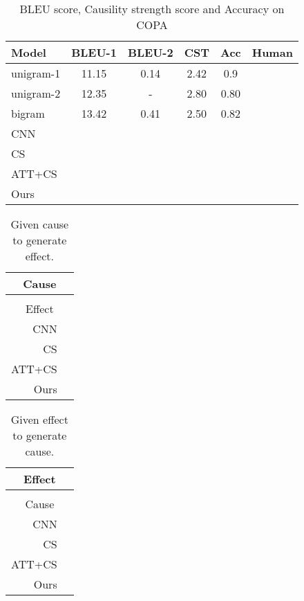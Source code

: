 \begin{table}[th]
	\centering
    \small
	\begin{tabular}{|l|c|c|c|c|c|}
		\hline
		Model &   BLEU-1 & BLEU-2 & CST & Acc & Human\\
		\hline
        unigram-1 & 11.15 & 0.14 & 2.42 & 0.9 & \\
        unigram-2 & 12.35 & -  & 2.80 & 0.80 & \\
        bigram & 13.42 & 0.41 & 2.50 & 0.82 & \\
		\hline
		CNN & & & & & \\
		CS & & & & & \\
		ATT+CS & & & & & \\
		\hline
		Ours & & & & & \\
		\hline
	\end{tabular}
	\caption{BLEU score, Causility strength score and Accuracy on COPA}
	\label{tab:copa}
\end{table}

\begin{table*}[th]
    \centering
    \small
    \begin{tabular}{r|l}%
    \hline
    \multicolumn{2}{c}{Cause}\\ 
    \hline
    \multicolumn{2}{c}{}\\ 
    \hline
    \multicolumn{2}{c}{Effect} \\
    \hline
    CNN & \\
    \hline
    CS & \\
    \hline
    ATT+CS & \\
    \hline
    Ours & \\
    \hline
    \end{tabular}
    \caption{Given cause to generate effect.}
    \label{tab:cause_exp}
\end{table*}

\begin{table*}[th]
    \centering
    \small
    \begin{tabular}{r|l}%
    \hline
    \multicolumn{2}{c}{Effect}\\ 
    \hline
    \multicolumn{2}{c}{}\\ 
    \hline
    \multicolumn{2}{c}{Cause} \\
    \hline
    CNN &  \\
    \hline
    CS &  \\
    \hline
    ATT+CS &  \\
    \hline
    Ours &  \\
    \hline
    \end{tabular}
    \caption{Given effect to generate cause.}
    \label{tab:effect_exp}
\end{table*}

